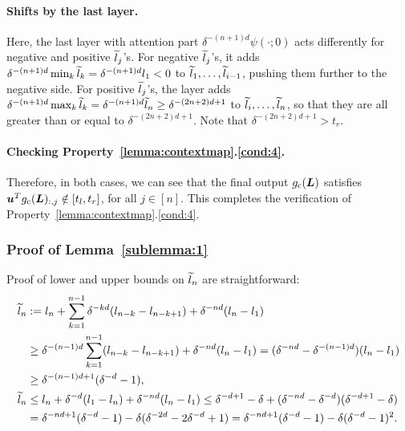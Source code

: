 \paragraph{Shifts by the last layer.}
Here, the last layer with attention part $\delta^{-(n+1)d} \psi(\cdot;0)$ acts differently for negative and positive $\widetilde{l}_j$'s. 
For negative $\widetilde{l}_j$'s, it adds $\delta^{-(n+1)d} \min_k \widetilde{l}_{k} = \delta^{-(n+1)d} l_1 < 0$ to $\widetilde{l}_1, \dots, \widetilde{l}_{i-1}$, pushing them further to the negative side.
For positive $\widetilde{l}_j$'s, the layer adds $\delta^{-(n+1)d} \max_k \widetilde{l}_{k} = \delta^{-(n+1)d} \widetilde{l}_n \geq \delta^{-(2n+2)d+1}$ to $\widetilde{l}_{i}, \dots, \widetilde{l}_{n}$, so that they are all greater than or equal to $\delta^{-(2n+2)d+1}$. Note that $\delta^{-(2n+2)d+1} > t_r$.

\paragraph{Checking Property~\ref{lemma:contextmap}.\ref{cond:4}.}
Therefore, in both cases, we can see that the final output $g_{\rm c}({\bm{L}})$ satisfies ${\bm{u}}^T g_{\rm c}({\bm{L}})_{:,j} \notin [t_l, t_r]$, for all $j \in [n]$.
This completes the verification of Property~\ref{lemma:contextmap}.\ref{cond:4}.

\subsubsection{Proof of Lemma~\ref{sublemma:1}}
\label{sec:proof-sublemma:1}
Proof of lower and upper bounds on $\widetilde{l}_n$ are straightforward:
\begin{align*}
    \widetilde{l}_n
    &:= l_n + \sum_{k=1}^{n-1} \delta^{-kd}(l_{n-k}-l_{n-k+1}) + \delta^{-nd} (l_n-l_1)\\
    &\geq \delta^{-(n-1)d}\sum_{k=1}^{n-1} (l_{n-k}-l_{n-k+1}) + \delta^{-nd} (l_n-l_1)
    = (\delta^{-nd}-\delta^{-(n-1)d}) (l_n-l_1)\\
    &\geq \delta^{-(n-1)d+1}(\delta^{-d} - 1),\\
    \widetilde{l}_n
    &\leq l_n + \delta^{-d} (l_1 - l_n) + \delta^{-nd}(l_n - l_1)
    \leq \delta^{-d+1} - \delta + (\delta^{-nd} - \delta^{-d}) (\delta^{-d+1} - \delta)\\
    &=\delta^{-nd + 1}(\delta^{-d}-1) - \delta (\delta^{-2d} - 2\delta^{-d} + 1)
    = \delta^{-nd + 1}(\delta^{-d}-1) - \delta (\delta^{-d} - 1)^2.
\end{align*}


